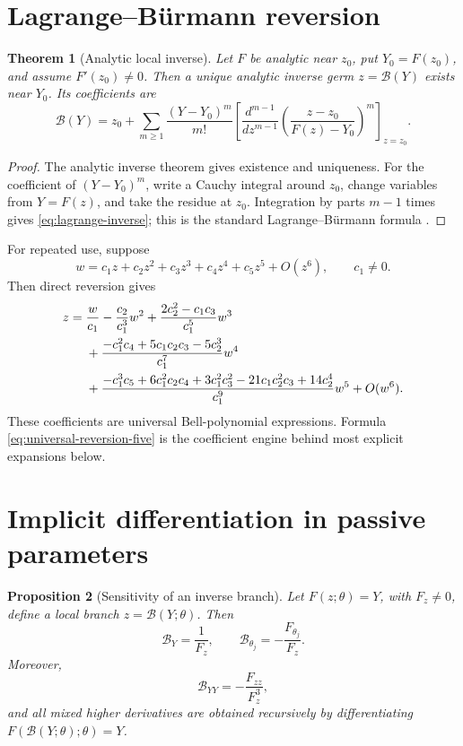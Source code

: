 \documentclass[11pt,a4paper,oneside,openany]{book}
\newtheorem{theorem}{Theorem}[chapter]
\newtheorem{proposition}[theorem]{Proposition}
\theoremstyle{definition}
\theoremstyle{remark}
\newcommand{\branch}{\mathscr B}
\begin{document}
\section{Lagrange--B\"urmann reversion}

\begin{theorem}[Analytic local inverse]\label{thm:analytic-inverse}
Let \(F\) be analytic near \(z_0\), put \(Y_0=F(z_0)\), and assume
\(F'(z_0)\ne0\).  Then a unique analytic inverse germ
\(z=\branch(Y)\) exists near \(Y_0\).  Its coefficients are
\begin{equation}\label{eq:lagrange-inverse}
 \branch(Y)=z_0+\sum_{m\ge1}\frac{(Y-Y_0)^m}{m!}
 \left[\frac{d^{m-1}}{dz^{m-1}}
 \left(\frac{z-z_0}{F(z)-Y_0}\right)^m\right]_{z=z_0}.
\end{equation}
\end{theorem}

\begin{proof}
The analytic inverse theorem gives existence and uniqueness.  For the
coefficient of \((Y-Y_0)^m\), write a Cauchy integral around \(z_0\), change
variables from \(Y=F(z)\), and take the residue at \(z_0\).  Integration by
parts \(m-1\) times gives \eqref{eq:lagrange-inverse}; this is the standard
Lagrange--B\"urmann formula \cite{FlajoletSedgewick,Henrici}.
\end{proof}

For repeated use, suppose
\[
 w=c_1z+c_2z^2+c_3z^3+c_4z^4+c_5z^5+O(z^6),\qquad c_1\ne0.
\]
Then direct reversion gives
\begin{align}
 z={}&\frac{w}{c_1}-\frac{c_2}{c_1^3}w^2
 +\frac{2c_2^2-c_1c_3}{c_1^5}w^3\notag\\
 &+\frac{-c_1^2c_4+5c_1c_2c_3-5c_2^3}{c_1^7}w^4\notag\\
 &+\frac{-c_1^3c_5+6c_1^2c_2c_4+3c_1^2c_3^2
 -21c_1c_2^2c_3+14c_2^4}{c_1^9}w^5+O(w^6).
\label{eq:universal-reversion-five}
\end{align}
These coefficients are universal Bell-polynomial expressions.  Formula
\eqref{eq:universal-reversion-five} is the coefficient engine behind most
explicit expansions below.

\section{Implicit differentiation in passive parameters}

\begin{proposition}[Sensitivity of an inverse branch]\label{prop:sensitivity}
Let \(F(z;\theta)=Y\), with \(F_z\ne0\), define a local branch
\(z=\branch(Y;\theta)\).  Then
\begin{equation}\label{eq:first-sensitivity}
 \branch_Y=\frac1{F_z},\qquad
 \branch_{\theta_j}=-\frac{F_{\theta_j}}{F_z}.
\end{equation}
Moreover,
\begin{equation}\label{eq:second-sensitivity}
 \branch_{YY}=-\frac{F_{zz}}{F_z^3},
\end{equation}
and all mixed higher derivatives are obtained recursively by differentiating
\(F(\branch(Y;\theta);\theta)=Y\).
\end{proposition}
\end{document}
